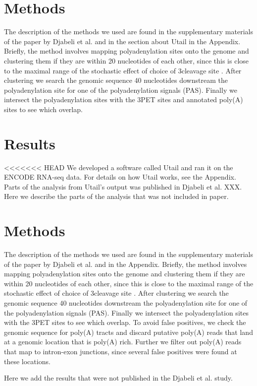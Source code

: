 \section{Methods}
The description of the methods we used are found in the supplementary materials
of the paper by Djabeli et al. and in the section about Utail in the Appendix.
Briefly, the method involves mapping polyadenylation sites onto the genome and
clustering them if they are within 20 nucleotides of each other, since this is
close to the maximal range of the stochastic effect of choice of 3\p cleavage
site \cite{tian_large-scale_2005}. After clustering we search the genomic
sequence 40 nucleotides downstream the polyadenylation site for one of the
polyadenylation signals (PAS). Finally we intersect the polyadenylation sites
with the 3\p PET sites and annotated poly(A) sites to see which overlap.

\section{Results}
<<<<<<< HEAD
We developed a software called Utail and ran it on the ENCODE RNA-seq data.
For details on how Utail works, see the Appendix. Parts of the analysis from
Utail's output was published in Djabeli et al. XXX. Here we describe the parts
of the analysis that was not included in paper.

\section{Methods}
The description of the methods we used are found in the supplementary materials
of the paper by Djabeli et al. and in the Appendix. Briefly, the method
involves mapping polyadenylation sites onto the genome and clustering them if
they are within 20 nucleotides of each other, since this is close to the
maximal range of the stochastic effect of choice of 3\p cleavage site
\cite{tian_large-scale_2005}. After clustering we search the genomic sequence
40 nucleotides downstream the polyadenylation site for one of the
polyadenylation signals (PAS). Finally we intersect the polyadenylation sites
with the 3\p PET sites to see which overlap. To avoid false positives, we check
the genomic sequence for poly(A) tracts and discard putative poly(A) reads that
land at a genomic location that is poly(A) rich. Further we filter out poly(A)
reads that map to intron-exon junctions, since several false positives were
found at these locations.

Here we add the results that were not published in the Djabeli et al. study.

